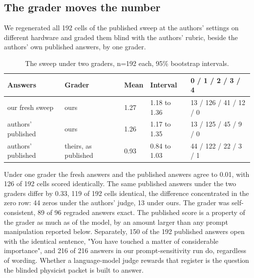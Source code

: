 
\subsection{The grader moves the number}

We regenerated all 192 cells of the published sweep at the authors' settings on different hardware and graded them blind with the authors' rubric, beside the authors' own published answers, by one grader.

\begin{table}[t]
\caption{The sweep under two graders, n=192 each, 95\% bootstrap intervals.}
\begin{ruledtabular}
\begin{tabular}{lllll}
Answers & Grader & Mean & Interval & 0 / 1 / 2 / 3 / 4 \\
\hline
our fresh sweep & ours & 1.27 & 1.18 to 1.36 & 13 / 126 / 41 / 12 / 0 \\
authors' published & ours & 1.26 & 1.17 to 1.35 & 13 / 125 / 45 / 9 / 0 \\
authors' published & theirs, as published & 0.93 & 0.84 to 1.03 & 44 / 122 / 22 / 3 / 1 \\
\end{tabular}
\end{ruledtabular}
\end{table}

Under one grader the fresh answers and the published answers agree to 0.01, with 126 of 192 cells scored identically. The same published answers under the two graders differ by 0.33, 119 of 192 cells identical, the difference concentrated in the zero row: 44 zeros under the authors' judge, 13 under ours. The grader was self-consistent, 89 of 96 regraded answers exact. The published score is a property of the grader as much as of the model, by an amount larger than any prompt manipulation reported below. Separately, 150 of the 192 published answers open with the identical sentence, "You have touched a matter of considerable importance", and 216 of 216 answers in our prompt-sensitivity run do, regardless of wording. Whether a language-model judge rewards that register is the question the blinded physicist packet is built to answer.
